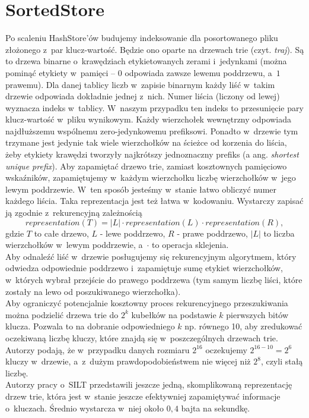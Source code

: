 \documentclass[declaration,shortabstract,masc]{iithesis}
\begin{document}
		\section{SortedStore}
			Po scaleniu HashStore'ów budujemy indeksowanie dla posortowanego pliku złożonego z~par klucz-wartość. Będzie ono oparte na drzewach trie (czyt. \textit{traj}). Są to drzewa binarne o~krawędziach etykietowanych zerami i~jedynkami (można pominąć etykiety w~pamięci -- $0$ odpowiada zawsze lewemu poddrzewu, a~$1$ prawemu). Dla danej tablicy liczb w~zapisie binarnym każdy liść w~takim drzewie odpowiada dokładnie jednej z~nich. Numer liścia (liczony od lewej) wyznacza indeks w~tablicy. W~naszym przypadku ten indeks to przesunięcie pary klucz-wartość w~pliku wynikowym. Każdy wierzchołek wewnętrzny odpowiada najdłuższemu wspólnemu zero-jedynkowemu prefiksowi. Ponadto w~drzewie tym trzymane jest jedynie tak wiele wierzchołków na ścieżce od korzenia do liścia, żeby etykiety krawędzi tworzyły najkrótszy jednoznaczny prefiks (a ang. \textit{shortest unique prefix}). Aby zapamiętać drzewo trie, zamiast kosztownych pamięciowo wskaźników, zapamiętujemy w~każdym wierzchołku liczbę wierzchołków w~jego lewym poddrzewie. W~ten sposób jesteśmy w~stanie łatwo obliczyć numer każdego liścia. Taka reprezentacja jest też łatwa w~kodowaniu. Wystarczy zapisać ją zgodnie z~rekurencyjną zależnością
			$$representation\left(T\right) = |L|\cdot representation\left(L\right)\cdot representation\left(R\right),$$
			gdzie $T$ to całe drzewo, $L$ - lewe poddrzewo, $R$ - prawe poddrzewo, $|L|$ to liczba wierzchołków w~lewym poddrzewie, a~$\cdot$ to operacja sklejenia.\\
			\indent Aby odnaleźć liść w~drzewie posługujemy się rekurencyjnym algorytmem, który odwiedza odpowiednie poddrzewo i~zapamiętuje sumę etykiet wierzchołków, w~których wybrał przejście do prawego poddrzewa (tym samym liczbę liści, które zostały na lewo od poszukiwanego wierzchołka).\\
			\indent Aby ograniczyć potencjalnie kosztowny proces rekurencyjnego przeszukiwania można podzielić drzewa trie do $2^k$ kubełków na podstawie $k$ pierwszych bitów klucza. Pozwala to na dobranie odpowiedniego $k$ np. równego 10, aby zredukować oczekiwaną liczbę kluczy, które znajdą się w~poszczególnych drzewach trie. Autorzy podają, że w~przypadku danych rozmiaru $2^{16}$ oczekujemy $2^{16-10} = 2^6$ kluczy w~drzewie, a~z~dużym prawdopodobieństwem nie więcej niż $2^8$, czyli stałą liczbę.\\
			\indent Autorzy pracy o~SILT przedstawili jeszcze jedną, skomplikowaną reprezentację drzew trie, która jest w~stanie jeszcze efektywniej zapamiętywać informacje o~kluczach. Średnio wystarcza w~niej około $0,4$ bajta na sekundkę.
\end{document}
